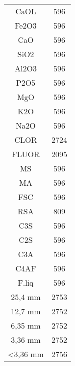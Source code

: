 \documentclass[a4paper]{article}
\begin{document}
\begin{center}
\begin{tabular}{ c c }
 CaOL       &      596\\
Fe2O3       &    596\\
CaO         &   596\\
SiO2        &  596\\
Al2O3       & 596\\
P2O5        & 596\\
MgO         & 596\\
K2O         & 596\\
Na2O        & 596\\
CLOR        & 2724\\
FLUOR       & 2095\\
MS          & 596\\
MA          & 596\\
FSC         & 596\\
RSA         & 809\\
C3S         & 596\\
C2S         & 596\\
C3A         & 596\\
C4AF        & 596\\
F.liq       & 596\\
25,4 mm     & 2753\\
12,7 mm     & 2752\\
6,35  mm    & 2752\\
3,36 mm     & 2752\\
\textless 3,36 mm    & 2756
\end{tabular}
\end{center}
\newpage
{}
\end{document}
